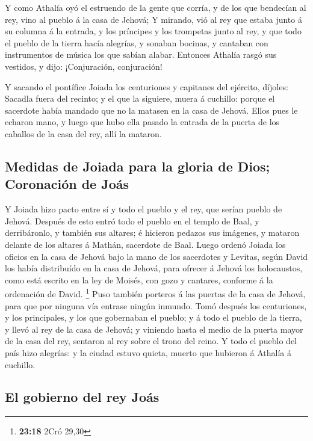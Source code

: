  Y como Athalía oyó el estruendo de la gente que corría,
y de los que bendecían al rey, vino al pueblo á la casa de Jehová;
 Y mirando, vió al rey que estaba junto á su columna á la
entrada, y los príncipes y los trompetas junto al rey, y que todo el
pueblo de la tierra hacía alegrías, y sonaban bocinas, y cantaban con
instrumentos de música los que sabían alabar. Entonces Athalía rasgó sus
vestidos, y dijo: ¡Conjuración, conjuración!

 Y sacando el pontífice Joiada los centuriones y
capitanes del ejército, díjoles: Sacadla fuera del recinto; y el que la
siguiere, muera á cuchillo: porque el sacerdote había mandado que no la
matasen en la casa de Jehová.  Ellos pues le echaron
mano, y luego que hubo ella pasado la entrada de la puerta de los
caballos de la casa del rey, allí la mataron.

\hypertarget{medidas-de-joiada-para-la-gloria-de-dios-coronaciuxf3n-de-jouxe1s}{%
\subsection{Medidas de Joiada para la gloria de Dios; Coronación de
Joás}\label{medidas-de-joiada-para-la-gloria-de-dios-coronaciuxf3n-de-jouxe1s}}

 Y Joiada hizo pacto entre sí y todo el pueblo y el rey,
que serían pueblo de Jehová.  Después de esto entró todo
el pueblo en el templo de Baal, y derribáronlo, y también sus altares; é
hicieron pedazos sus imágenes, y mataron delante de los altares á
Mathán, sacerdote de Baal.  Luego ordenó Joiada los
oficios en la casa de Jehová bajo la mano de los sacerdotes y Levitas,
según David los había distribuído en la casa de Jehová, para ofrecer á
Jehová los holocaustos, como está escrito en la ley de Moisés, con gozo
y cantares, conforme á la ordenación de David. \footnote{\textbf{23:18}
  2Cró 29,30}  Puso también porteros á las puertas de la
casa de Jehová, para que por ninguna vía entrase ningún inmundo.
 Tomó después los centuriones, y los principales, y los
que gobernaban el pueblo; y á todo el pueblo de la tierra, y llevó al
rey de la casa de Jehová; y viniendo hasta el medio de la puerta mayor
de la casa del rey, sentaron al rey sobre el trono del reino.
 Y todo el pueblo del país hizo alegrías: y la ciudad
estuvo quieta, muerto que hubieron á Athalía á cuchillo.

\hypertarget{el-gobierno-del-rey-jouxe1s}{%
\subsection{El gobierno del rey
Joás}\label{el-gobierno-del-rey-jouxe1s}}

